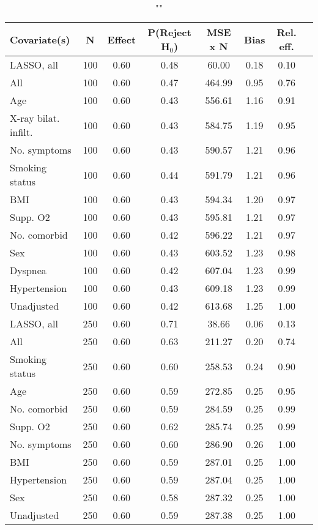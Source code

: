 \documentclass{article}
\begin{document}
{\tabcolsep=6pt  %
\begin{longtable}{lccccccc}
\caption{""} \\
Covariate(s) & N & Effect & P(Reject H$_0$) & MSE x N & Bias & Rel. eff.\\ \midrule
LASSO, all & 100 & 0.60 & 0.48 &  60.00 & 0.18 & 0.10 \\ 
All & 100 & 0.60 & 0.47 & 464.99 & 0.95 & 0.76 \\ 
Age & 100 & 0.60 & 0.43 & 556.61 & 1.16 & 0.91 \\ 
X-ray bilat. infilt. & 100 & 0.60 & 0.43 & 584.75 & 1.19 & 0.95 \\ 
No. symptoms & 100 & 0.60 & 0.43 & 590.57 & 1.21 & 0.96 \\ 
Smoking status & 100 & 0.60 & 0.44 & 591.79 & 1.21 & 0.96 \\ 
BMI & 100 & 0.60 & 0.43 & 594.34 & 1.20 & 0.97 \\ 
Supp. O2 & 100 & 0.60 & 0.43 & 595.81 & 1.21 & 0.97 \\ 
No. comorbid & 100 & 0.60 & 0.42 & 596.22 & 1.21 & 0.97 \\ 
Sex & 100 & 0.60 & 0.43 & 603.52 & 1.23 & 0.98 \\ 
Dyspnea & 100 & 0.60 & 0.42 & 607.04 & 1.23 & 0.99 \\ 
Hypertension & 100 & 0.60 & 0.43 & 609.18 & 1.23 & 0.99 \\ 
Unadjusted & 100 & 0.60 & 0.42 & 613.68 & 1.25 & 1.00 \\ \midrule 
LASSO, all & 250 & 0.60 & 0.71 &  38.66 & 0.06 & 0.13 \\ 
All & 250 & 0.60 & 0.63 & 211.27 & 0.20 & 0.74 \\ 
Smoking status & 250 & 0.60 & 0.60 & 258.53 & 0.24 & 0.90 \\ 
Age & 250 & 0.60 & 0.59 & 272.85 & 0.25 & 0.95 \\ 
No. comorbid & 250 & 0.60 & 0.59 & 284.59 & 0.25 & 0.99 \\ 
Supp. O2 & 250 & 0.60 & 0.62 & 285.74 & 0.25 & 0.99 \\ 
No. symptoms & 250 & 0.60 & 0.60 & 286.90 & 0.26 & 1.00 \\ 
BMI & 250 & 0.60 & 0.59 & 287.01 & 0.25 & 1.00 \\ 
Hypertension & 250 & 0.60 & 0.59 & 287.04 & 0.25 & 1.00 \\ 
Sex & 250 & 0.60 & 0.58 & 287.32 & 0.25 & 1.00 \\ 
Unadjusted & 250 & 0.60 & 0.59 & 287.38 & 0.25 & 1.00 \\ 

\end{longtable}}
\end{document}
